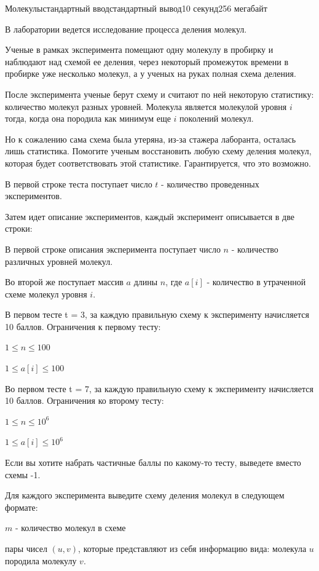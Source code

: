 \begin{problem}{Молекулы}{стандартный ввод}{стандартный вывод}{10 секунд}{256 мегабайт}

В лаборатории ведется исследование процесса деления молекул. 

Ученые в рамках эксперимента помещают одну молекулу в пробирку и наблюдают над схемой ее деления, через некоторый промежуток времени в пробирке уже несколько молекул, а у ученых на руках полная схема деления.

После эксперимента ученые берут схему и считают по ней некоторую статистику: количество молекул разных уровней. Молекула является молекулой уровня $i$ тогда, когда она породила как минимум еще $i$ поколений молекул.

Но к сожалению сама схема была утеряна, из-за стажера лаборанта, осталась лишь статистика. Помогите ученым восстановить любую схему деления молекул, которая будет соответствовать этой статистике. Гарантируется, что это возможно.

\InputFile
В первой строке теста поступает число $t$ - количество проведенных экспериментов.

Затем идет описание экспериментов, каждый эксперимент описывается в две строки:

 
В первой строке описания эксперимента поступает число $n$ - количество различных уровней молекул. 

Во второй же поступает массив $a$ длины $n$, где $a[i]$ - количество в утраченной схеме молекул уровня $i$.

В первом тесте t = 3, за каждую правильную схему к эксперименту начисляется 10 баллов. Ограничения к первому тесту:

$1 \le n \le 100$

$1 \le a[i] \le 100$


Во первом тесте t = 7, за каждую правильную схему к эксперименту начисляется 10 баллов.
Ограничения ко второму тесту:

$1 \le n \le 10^6$

$1 \le a[i] \le 10^6$

Если вы хотите набрать частичные баллы по какому-то тесту, выведете вместо схемы -1.



\OutputFile
Для каждого эксперимента выведите схему деления молекул в следующем формате:

$m$ - количество молекул в схеме

пары чисел $(u, v)$, которые представляют из себя информацию вида: молекула $u$ породила молекулу $v$.


\end{problem}
